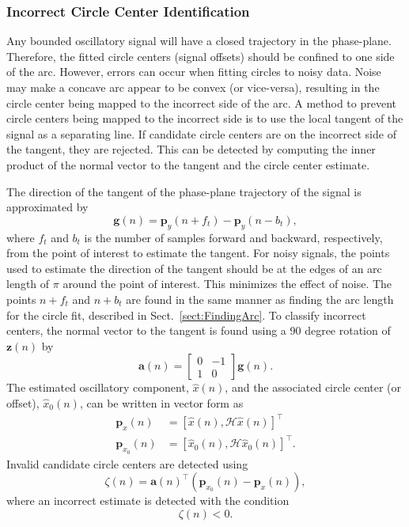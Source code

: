 \documentclass[a4paper]{IEEEtran}
\begin{document}
\subsubsection{Incorrect Circle Center Identification}
Any bounded oscillatory signal will have a closed trajectory in the phase-plane. Therefore, the fitted circle centers (signal offsets) should be confined to one side of the arc. However, errors can occur when fitting circles to noisy data. Noise may make a concave arc appear to be convex (or vice-versa), resulting in the circle center being mapped to the incorrect side of the arc. A method to prevent circle centers being mapped to the incorrect side is to use the local tangent of the signal as a separating line. If candidate circle centers are on the incorrect side of the tangent, they are rejected. This can be detected by computing the inner product of the normal vector to the tangent and the circle center estimate. 

The direction of the tangent of the phase-plane trajectory of the signal is approximated by 
\begin{equation}
	\mathbf{g}(n) = \mathbf{p}_y(n + f_t) - \mathbf{p}_y(n - b_t),
\end{equation}
where $f_t$ and $b_t$ is the number of samples forward and backward, respectively, from the point of interest to estimate the tangent. For noisy signals, the points used to estimate the direction of the tangent should be at the edges of an arc length of $\pi$ around the point of interest. This minimizes the effect of noise. The points $n+f_t$ and $n+b_t$ are found in the same manner as finding the arc length for the circle fit, described in Sect.~\ref{sect:FindingArc}. To classify incorrect centers, the normal vector to the tangent is found using a 90 degree rotation of $\mathbf{z}(n)$ by
\begin{equation}
	\mathbf{a}\left(n\right) = \left[\begin{array}{cc}
	0 & -1 \\
	1 & 0\end{array}\right]\mathbf{g}(n).
\end{equation}
The estimated oscillatory component, $\hat{x}(n)$, and the associated circle center (or offset), $\hat{x}_0(n)$, can be written in vector form as
\begin{align}
	\mathbf{p}_x(n) &= \left[\hat{x}\left(n\right),\mathcal{H}\hat{x}\left(n\right)\right]^{\top} \\ 
	\mathbf{p}_{x_0}\left(n\right) &= \left[\hat{x}_0\left(n\right), \mathcal{H}\hat{x}_0\left(n\right)\right]^{\top}. 
\end{align}
Invalid candidate circle centers are detected using 
\begin{equation}
    \zeta(n) = \mathbf{a}\left( n\right)^{\top}\left( \mathbf{p}_{x_0}\left( n \right) - \mathbf{p}_x\left( n\right) \right),
\end{equation}
where an incorrect estimate is detected with the condition
\begin{equation}\label{eq:IncorrectSideClassifier}
    \zeta(n) < 0.
\end{equation} 
\end{document}
